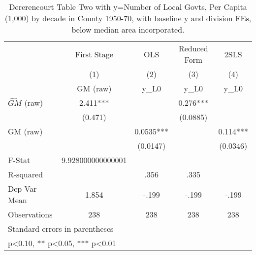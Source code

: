 \begin{table}[htbp]\centering
\def\sym#1{\ifmmode^{#1}\else\(^{#1}\)\fi}
\caption{Dererencourt Table Two with y=Number of Local Govts, Per Capita (1,000) by decade in County 1950-70, with baseline y and division FEs, below median area incorporated.}
\begin{tabular}{l*{4}{c}}
\toprule
                    & First Stage   &         OLS   &Reduced Form   &        2SLS   \\
                    &\multicolumn{1}{c}{(1)}&\multicolumn{1}{c}{(2)}&\multicolumn{1}{c}{(3)}&\multicolumn{1}{c}{(4)}\\
                    &\multicolumn{1}{c}{GM  (raw)}&\multicolumn{1}{c}{y\_L0}&\multicolumn{1}{c}{y\_L0}&\multicolumn{1}{c}{y\_L0}\\
\midrule
$\hat{GM}$ (raw)    &       2.411***&               &       0.276***&               \\
                    &     (0.471)   &               &    (0.0885)   &               \\
\addlinespace
GM  (raw)           &               &      0.0535***&               &       0.114***\\
                    &               &    (0.0147)   &               &    (0.0346)   \\
\midrule
F-Stat              &9.928000000000001   &               &               &               \\
R-squared           &               &        .356   &        .335   &               \\
Dep Var Mean        &       1.854   &       -.199   &       -.199   &       -.199   \\
Observations        &         238   &         238   &         238   &         238   \\
\bottomrule
\multicolumn{5}{l}{\footnotesize Standard errors in parentheses}\\
\multicolumn{5}{l}{\footnotesize * p<0.10, ** p<0.05, *** p<0.01}\\
\end{tabular}
\end{table}
